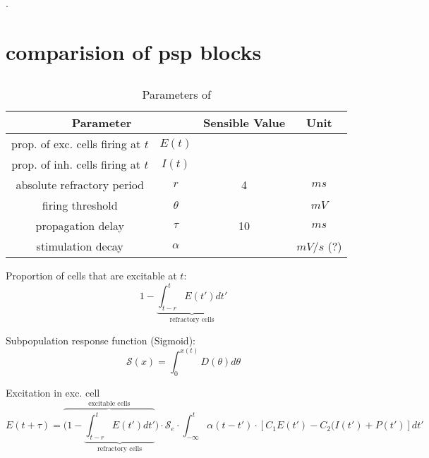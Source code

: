 

\pagebreak
.
\pagebreak
\section{comparision of psp blocks}


\subsection{\parencite{wilson_excitatory_1972}}

\begin{table}[H]
	\centering
	\begin{tabular}{ |c|c|c|c| } 
		\hline
		\multicolumn{2}{|c|}{Parameter}  & Sensible Value & Unit \\
		\hline
		\hline
		prop. of exc. cells firing at $t$ & \(E(t)\) & \( \) & \( \) \\
		\hline
		prop. of inh. cells firing at $t$ & \(I(t)\) & \( \) & \( \) \\
		\hline
		absolute refractory period & $r$ & 4 & $ms$ \\
		\hline
		firing threshold & $\theta$ & & $mV$ \\
		\hline
		propagation delay & $\tau$ & 10 & $ms$ \\
		\hline
		stimulation decay & $\alpha$ & & $mV/s$ (?) \\
		\hline
	\end{tabular}
	\caption{Parameters of \parencite{wilson_excitatory_1972}}
	\label{table:params_wilsoncowan}
\end{table}

Proportion of cells that are excitable at $t$:
\begin{equation}
	1 - \underbrace{\int_{t-r}^{t} E(t') dt'}_{\text{refractory cells}}
\end{equation}

Subpopulation response function (Sigmoid):
\begin{equation}
	\mathscr{S}(x) = \int_{0}^{x(t)} D(\theta) d\theta 
\end{equation}

Excitation in exc. cell
\begin{equation}
	E(t+\tau) = \overbrace{(1 - \underbrace{\int_{t-r}^{t} E(t') dt'}_{\text{refractory cells}}}^{\text{excitable cells}}) \cdot \mathscr{S}_e \cdot \int_{-\infty}^{t}\alpha(t-t') \cdot [C_1E(t') - C_2(I(t') + P(t')] dt'
\end{equation}



